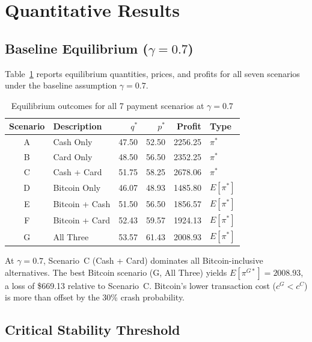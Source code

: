 \documentclass{article}
\begin{document}
\section{Quantitative Results}
\label{sec:results}

\subsection{Baseline Equilibrium ($\gamma = 0.7$)}
\label{sec:baseline}

Table~\ref{tab:equilibrium_baseline} reports equilibrium quantities, prices,
and profits for all seven scenarios under the baseline assumption $\gamma = 0.7$.

\begin{table}[h]
\centering
\caption{Equilibrium outcomes for all 7 payment scenarios at $\gamma = 0.7$}
\label{tab:equilibrium_baseline}
\begin{tabular}{clrrrl}
\toprule
Scenario & Description & $q^*$ & $p^*$ & Profit & Type \\
\midrule
A & Cash Only              & 47.50 & 52.50 & 2256.25 & $\pi^*$ \\
B & Card Only              & 48.50 & 56.50 & 2352.25 & $\pi^*$ \\
C & Cash + Card            & 51.75 & 58.25 & 2678.06 & $\pi^*$ \\
D & Bitcoin Only           & 46.07 & 48.93 & 1485.80 & $E[\pi^*]$ \\
E & Bitcoin + Cash         & 51.50 & 56.50 & 1856.57 & $E[\pi^*]$ \\
F & Bitcoin + Card         & 52.43 & 59.57 & 1924.13 & $E[\pi^*]$ \\
G & All Three              & 53.57 & 61.43 & 2008.93 & $E[\pi^*]$ \\
\bottomrule
\end{tabular}
\end{table}

At $\gamma = 0.7$, Scenario~C (Cash + Card) dominates all Bitcoin-inclusive
alternatives.
The best Bitcoin scenario (G, All Three) yields $E[\pi^{G*}] = 2008.93$,
a loss of \$669.13 relative to Scenario~C.
Bitcoin's lower transaction cost ($c^G < c^C$) is more than offset by the
30\% crash probability.

\subsection{Critical Stability Threshold}
\label{sec:threshold}
\end{document}
